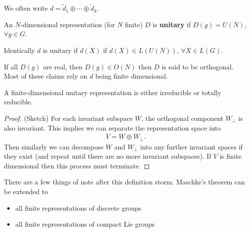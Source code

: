 We often write $d = \widetilde{d}_1 \oplus \cdots \oplus \widetilde{d}_k$.

\begin{definition}
    An $N$-dimensional representation (for $N$ finite) $D$ is \textbf{unitary} if $D \left( g \right) = U \left( N \right) $, $\forall g \in G$.

    Identically $d$ is unitary if $d \left( X \right) $ if $d \left( X \right) \in L \left( U \left( N \right)  \right) $, $\forall X \in L \left( G \right) $.
\end{definition}

If all $D \left( g \right) $ are real, then $D \left( g \right) \in O \left( N \right) $ then $D$ is said to be orthogonal. Most of these claims rely on $d$ being finite dimensional.


\begin{theorem}[ (Maschke)]
    A finite-dimensional unitary representation is either irreducible or totally reducible.
\end{theorem}

\begin{proof}(Sketch)
    For each invariant subspace $W$, the orthogonal component $W_\perp$ is also invariant. This implies we can separate the representation space into
    \begin{align}
        V = W \oplus W_{\perp}
    .\end{align}
    Then similarly we can decompose $W$ and $W_\perp$ into any further invariant spaces if they exist (and repeat until there are no more invariant subspaces). If $V$ is finite dimensional then this process must terminate.
\end{proof}

\begin{note}
    There are a few things of note after this definition storm. Maschke's theorem can be extended to 
    \begin{itemize}
        \item all finite representations of discrete groups
        \item all finite representations of compact Lie groups 
    \end{itemize}
\end{note}

